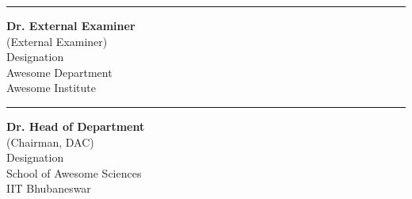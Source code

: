 \vspace*{15pt}
\begin{center}
\begin{minipage}[t]{0.4\textwidth}
    \hrule\vspace{2ex}
    \begin{flushleft}
    {\small {\bfseries Dr. External Examiner}\\
    (External Examiner)\\
    Designation\\
    Awesome Department\\
    Awesome Institute}
    \end{flushleft}
\end{minipage}
\hfill
\begin{minipage}[t]{0.4\textwidth}
    \begin{flushright}
    \hrule\vspace{2ex}
    {\small {\bfseries Dr. Head of Department}\\
    (Chairman, DAC)\\
    Designation\\
    School of Awesome Sciences\\
    IIT Bhubaneswar}
    \end{flushright}
\end{minipage}
\end{center}


\newpage
\thispagestyle{empty}
\null\newpage
